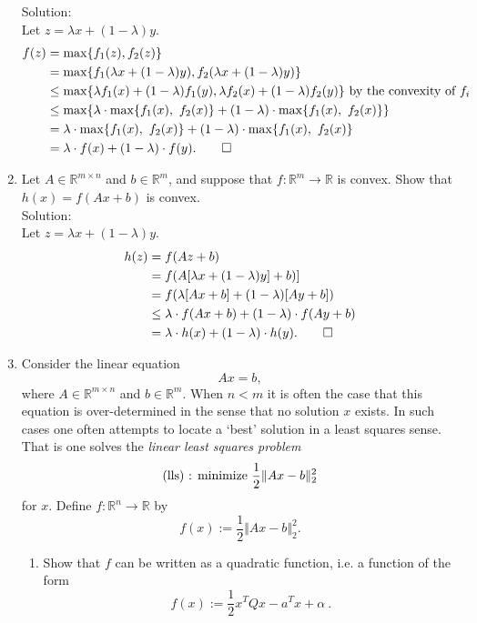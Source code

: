 \documentclass[12pt]{amsart}
\newcommand{\norm}[1]{\Vert #1 \Vert}
\newcommand{\Rn}{\R^n}
\newcommand{\Rm}{\R^m}
\newcommand{\R}{{\mathbb{R}}}
\newcommand{\map}[3]{#1:#2\rightarrow #3}
\newcommand{\half}{\frac{1}{2}}
\newcommand{\Rmn}{\R^{m\times n}}
\newcommand{\tpose}[1]{#1^{\scriptscriptstyle T}}
\begin{document}
\begin{enumerate}
\noindent
Solution: \\

Let $z = \lambda x + (1-\lambda) y$.
\begin{align*}
f(z) &= \max \{f_1(z), f_2(z)\} \\
        &= \max \{f_1(\lambda x + (1-\lambda) y), f_2(\lambda x + (1-\lambda) y)\}  \\
      &\leq \max \{\lambda f_1(x) + (1-\lambda) f_1(y), \lambda f_2(x) + (1-\lambda) f_2(y)\} \text{ by the convexity of } f_i\\
     &\leq \max \{\lambda \cdot \max\{f_1(x),\ f_2(x)\} + (1-\lambda) \cdot \max\{f_1(x),\ f_2(x)\}    \}\\
   & = \lambda \cdot \max\{f_1(x),\ f_2(x)\} + (1-\lambda) \cdot \max\{f_1(x),\ f_2(x)\}\\
   & = \lambda \cdot f(x) + (1-\lambda) \cdot f(y). \qed
\end{align*} 


\item
Let $A\in\R^{m\times n}$ and $b\in\Rm$, and suppose that
$\map{f}{\Rm}{\R}$ is convex. Show that $h(x)=f(Ax+b)$ is convex. \\

\noindent
Solution: \\

Let $z = \lambda x + (1-\lambda) y$.
\begin{align*}
h(z) &= f(Az + b)\\
&= f(A[\lambda x + (1-\lambda) y] + b)]\\
&= f(\lambda[Ax+b] + (1-\lambda)[Ay+b])\\
&\leq \lambda \cdot f(Ax+b) + (1-\lambda) \cdot f(Ay+b)\\
&= \lambda \cdot h(x) + (1-\lambda) \cdot h(y).  \qed
\end{align*}

\item
 Consider the linear equation $$Ax=b,$$ where $A \in \Rmn$
and $b \in \Rm$. When $n<m$ it is often the case that this
equation is over-determined in the sense that no solution $x$
exists. In such cases one often attempts to locate a `best'
solution in a least squares sense. That is one solves the
{\it linear least squares problem}
$$\hbox{(lls) : minimize } \half \norm{Ax-b}^2_2$$
for $x$. Define $\map{f}{\Rn}{\R}$ by
$$f(x):= \half \norm{Ax-b}^2_2.$$
\begin{enumerate}
\item Show that $f$ can be written as a quadratic function, i.e.
a function of the form
$$f(x):=\frac{1}{2} \tpose{x} Q x -\tpose{a}x +\alpha \  .$$


\end{enumerate}
\end{enumerate}
\end{document}
